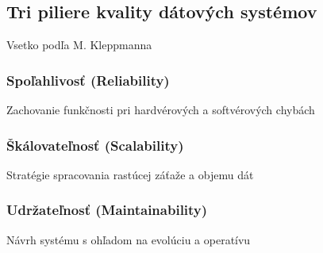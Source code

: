 \documentclass[../../../thesis.tex]{subfiles}
\begin{document}
    \subsection{Tri piliere kvality dátových systémov}

    Vsetko podľa M. Kleppmanna

    \subsubsection*{Spoľahlivosť (Reliability)}
    Zachovanie funkčnosti pri hardvérových a softvérových chybách

    \subsubsection*{Škálovateľnosť (Scalability)}
    Stratégie spracovania rastúcej záťaže a objemu dát

    \subsubsection*{Udržateľnosť (Maintainability)}

    Návrh systému s ohľadom na evolúciu a operatívu
\end{document}
